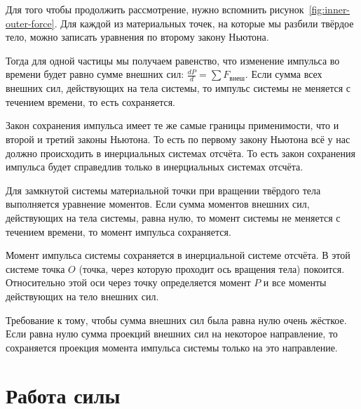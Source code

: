 Для того чтобы продолжить рассмотрение, нужно вспомнить
рисунок~\ref{fig:inner-outer-force}. Для каждой из материальных точек, на
которые мы разбили твёрдое тело, можно записать уравнения по второму закону
Ньютона.

\begin{theorem}\label{thrm:keep-moment-impuls}
  Тогда для одной частицы мы получаем равенство, что изменение
  импульса во времени
  будет равно сумме внешних сил: \( \frac{d P}{d} = \sum F_\text{внеш} \). Если
  сумма всех внешних сил, действующих на тела системы, то импульс системы не
  меняется с течением времени, то есть сохраняется.

  \begin{corollary}
    Закон сохранения импульса имеет те же самые границы применимости,
    что и второй
    и третий законы Ньютона. То есть по первому закону Ньютона всё у нас должно
    происходить в инерциальных системах отсчёта. То есть закон
    сохранения импульса
    будет справедлив только в инерциальных системах отсчёта.
  \end{corollary}

  Для замкнутой системы материальной точки при вращении твёрдого тела
  выполняется
  уравнение моментов. Если сумма моментов внешних сил, действующих на тела
  системы, равна нулю, то момент системы не меняется с течением времени, то
  момент импульса сохраняется.

  \begin{corollary}
    Момент импульса системы сохраняется в инерциальной системе отсчёта. В этой
    системе точка $O$ (точка, через которую проходит ось вращения
    тела) покоится.
    Относительно этой оси через точку определяется момент $P$ и все моменты
    действующих на тело внешних сил.
  \end{corollary}

  \begin{corollary}
    Требование к тому, чтобы сумма внешних сил была равна нулю очень жёсткое.
    Если равна нулю сумма проекций внешних сил на некоторое направление, то
    сохраняется проекция момента импульса системы только на это направление.
  \end{corollary}

\end{theorem}

\section{Работа силы}%

